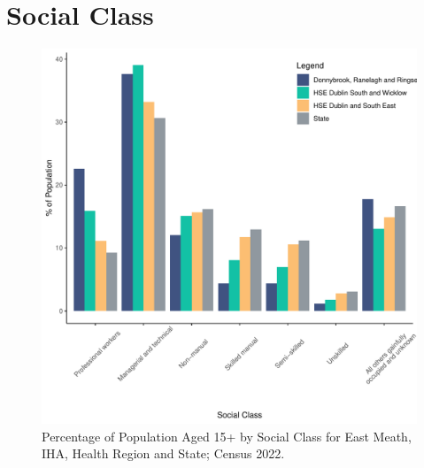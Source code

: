 \documentclass{article}
\begin{document}
\section{Social Class}\label{sect:SC}
\begin{figure}[H]
	\centering
	\includegraphics[width = 140mm]{../figures/SocialClassED.pdf}
	\caption{Percentage of Population Aged 15+ by Social Class for East Meath, IHA, Health Region and State; Census 2022.}
	\label{fig:vbnv}
	\end{figure}
\end{document}
